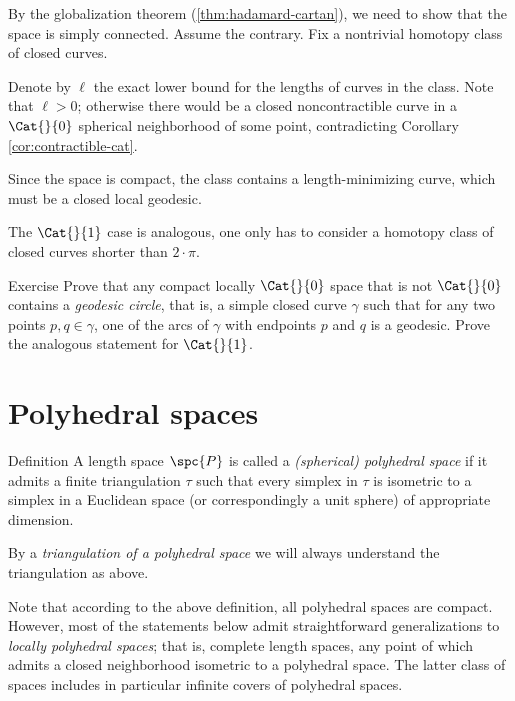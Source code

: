 By the globalization theorem (\ref{thm:hadamard-cartan}), we need to show that the space is simply connected.
Assume the contrary. 
Fix a nontrivial homotopy class of closed curves.

Denote by $\ell$ the exact lower bound for the lengths of curves in the class.
Note that $\ell>0$;
otherwise there would be a closed noncontractible curve in a $\Cat{}{0}$ spherical neighborhood of some point, contradicting Corollary \ref{cor:contractible-cat}.

Since the space is compact, the class contains a length-minimizing curve, 
which must be a closed local geodesic. 

The $\Cat{}{1}$ case is analogous, one only has to consider a homotopy class of closed curves shorter than $2\cdot\pi$.
\qeds

\begin{thm}{Exercise}\label{ex:geod-circle}
Prove that any compact locally $\Cat{}{0}$ space that is not $\Cat{}{0}$  contains a \emph{geodesic circle}, 
that is, a simple closed curve $\gamma$ such that 
for any two points $p,q\in\gamma$, one of the arcs of $\gamma$ with endpoints $p$ and $q$ is a  geodesic.
Prove the analogous statement  for  $\Cat{}{1}$.
\end{thm}

\section{Polyhedral spaces}

\begin{thm}{Definition}\label{def:poly}
A length space $\spc{P}$ is called  
a \emph{(spherical) polyhedral space} 
if it admits a finite triangulation $\tau$ 
such that every simplex in $\tau$ is isometric to a simplex in a Euclidean space (or correspondingly a unit sphere) of appropriate dimension.

By a 
\emph{triangulation of a polyhedral space} 
we will always understand the triangulation as above. 
\end{thm}

Note that according to the above definition,
all polyhedral spaces are compact.
However, 
most of the statements below admit straightforward generalizations 
to \emph{locally polyhedral spaces};
that is, complete length spaces,  
any point of which admits a closed neighborhood isometric to a polyhedral space.
The latter class of spaces includes in particular infinite covers of polyhedral spaces.

